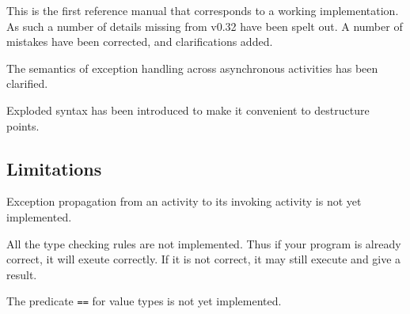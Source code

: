 
This is the first reference manual that corresponds to a working
implementation. As such a number of details missing from v0.32 have
been spelt out. A number of mistakes have been corrected, and
clarifications added.

The semantics of exception handling across asynchronous activities has
been clarified.

Exploded syntax has been introduced to make it convenient to
destructure points. 

\subsection{Limitations}

Exception propagation from an activity to its invoking activity is not
yet implemented.

All the type checking rules are not implemented. Thus if your program
is already correct, it will exeute correctly. If it is not correct, it
may still execute and give a result.

The predicate {\tt ==} for value types is not yet implemented.

